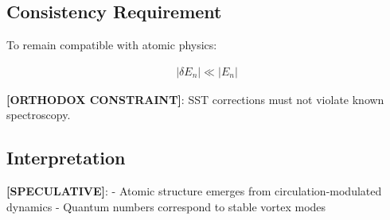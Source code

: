     \subsection{Consistency Requirement}
        
        To remain compatible with atomic physics:
        
        \begin{align}
            |\delta E_n| \ll |E_n|
        \end{align}
        
        \textbf{[ORTHODOX CONSTRAINT]}: SST corrections must not violate known spectroscopy.
    
    \subsection{Interpretation}
        
        \textbf{[SPECULATIVE]}:
        - Atomic structure emerges from circulation-modulated dynamics
        - Quantum numbers correspond to stable vortex modes